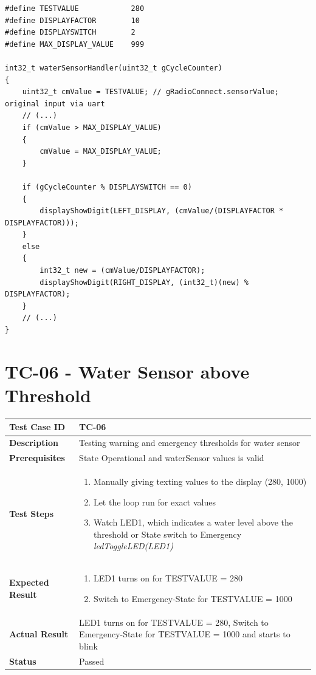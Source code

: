 \begin{lstlisting}[style=CStyle]
#define TESTVALUE			 280
#define DISPLAYFACTOR        10
#define DISPLAYSWITCH        2
#define MAX_DISPLAY_VALUE    999

int32_t waterSensorHandler(uint32_t gCycleCounter)
{
    uint32_t cmValue = TESTVALUE; // gRadioConnect.sensorValue; original input via uart 
    // (...)
    if (cmValue > MAX_DISPLAY_VALUE)
	{
		cmValue = MAX_DISPLAY_VALUE;
	}

	if (gCycleCounter % DISPLAYSWITCH == 0)
	{
		displayShowDigit(LEFT_DISPLAY, (cmValue/(DISPLAYFACTOR * DISPLAYFACTOR)));
	}
	else
	{
		int32_t new = (cmValue/DISPLAYFACTOR);
		displayShowDigit(RIGHT_DISPLAY, (int32_t)(new) % DISPLAYFACTOR);
	}
    // (...)
}
\end{lstlisting}

\newpage

\section{TC-06 - Water Sensor above Threshold}

\renewcommand{\arraystretch}{1.4}

\begin{table}[h]
\centering
\begin{tabular}{|p{}|p{}|}
\hline
\textbf{Test Case ID} & TC-06 \\ \hline
\textbf{Description} & Testing warning and emergency thresholds for water sensor \\ \hline
\textbf{Prerequisites} & State Operational and waterSensor values is valid \\ \hline
\textbf{Test Steps} &
\begin{enumerate}
\item Manually giving texting values to the display (280, 1000)
\item Let the loop run for exact values
\item Watch LED1, which indicates a water level above the threshold or State switch to Emergency \textit{ledToggleLED(LED1)}
\end{enumerate}
\\ \hline
\textbf{Expected Result} & 
\begin{enumerate}
\item LED1 turns on for TESTVALUE = 280
\item Switch to Emergency-State for TESTVALUE = 1000
\end{enumerate}
\\ \hline
\textbf{Actual Result} & LED1 turns on for TESTVALUE = 280, Switch to Emergency-State for TESTVALUE = 1000 and starts to blink \\ \hline
\textbf{Status} & \textcolor{green!60!black}{Passed} \\ \hline
\end{tabular}
\end{table}
\newpage
